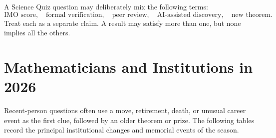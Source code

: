     \begin{strategy}
        A Science Quiz question may deliberately mix the following terms:
        \[
            \text{IMO score},\quad
            \text{formal verification},\quad
            \text{peer review},\quad
            \text{AI-assisted discovery},\quad
            \text{new theorem}.
        \]
        Treat each as a separate claim. A result may satisfy more than one, but
        none implies all the others.
    \end{strategy}

    \chapter{Mathematicians and Institutions in 2026}

    Recent-person questions often use a move, retirement, death, or unusual
    career event as the first clue, followed by an older theorem or prize. The
    following tables record the principal institutional changes and memorial
    events of the season.

    \vspace{1em}

